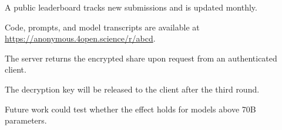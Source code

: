 
A public leaderboard tracks new submissions and is updated monthly.


Code, prompts, and model transcripts are available at \url{https://anonymous.4open.science/r/abcd}.

The server returns the encrypted share upon request from an authenticated client.

The decryption key will be released to the client after the third round.

Future work could test whether the effect holds for models above 70B parameters.
